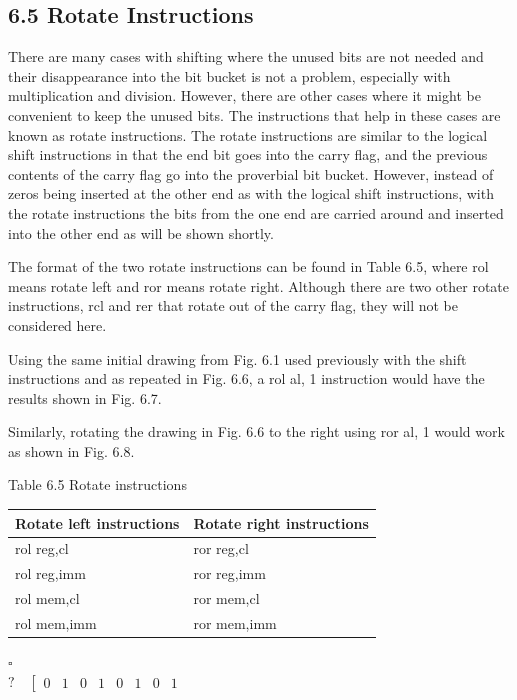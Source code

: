 \documentclass[10pt]{article}
\begin{document}
\subsection*{6.5 Rotate Instructions}
There are many cases with shifting where the unused bits are not needed and their disappearance into the bit bucket is not a problem, especially with multiplication and division. However, there are other cases where it might be convenient to keep the unused bits. The instructions that help in these cases are known as rotate instructions. The rotate instructions are similar to the logical shift instructions in that the end bit goes into the carry flag, and the previous contents of the carry flag go into the proverbial bit bucket. However, instead of zeros being inserted at the other end as with the logical shift instructions, with the rotate instructions the bits from the one end are carried around and inserted into the other end as will be shown shortly.

The format of the two rotate instructions can be found in Table 6.5, where rol means rotate left and ror means rotate right. Although there are two other rotate instructions, rcl and rer that rotate out of the carry flag, they will not be considered here.

Using the same initial drawing from Fig. 6.1 used previously with the shift instructions and as repeated in Fig. 6.6, a rol al, 1 instruction would have the results shown in Fig. 6.7.

Similarly, rotating the drawing in Fig. 6.6 to the right using ror al, 1 would work as shown in Fig. 6.8.

Table 6.5 Rotate instructions

\begin{center}
\begin{tabular}{|ll|}
\hline
Rotate left instructions & Rotate right instructions \\
\hline
rol reg,cl & ror reg,cl \\
rol reg,imm & ror reg,imm \\
rol mem,cl & ror mem,cl \\
rol mem,imm & ror mem,imm \\
\hline
\end{tabular}
\end{center}

$\square$\\
$? \quad\left[\begin{array}{llllllll}0 & 1 & 0 & 1 & 0 & 1 & 0 & 1\end{array}\right.$
\end{document}
